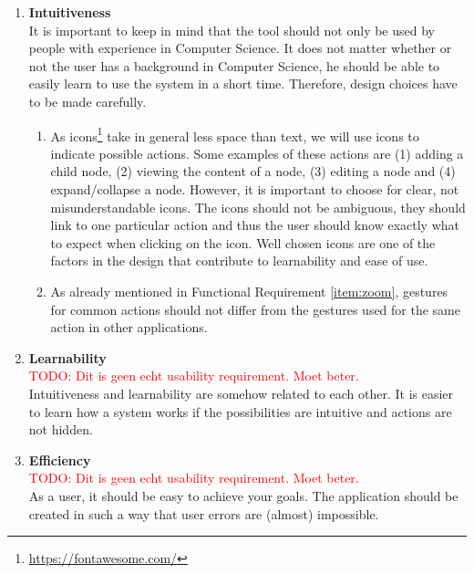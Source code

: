 \begin{enumerate}[label=\textbf{\arabic*}., ref=\arabic*]
	\item \textbf{Intuitiveness\label{item:intuitiveness}} \hfill \\
	It is important to keep in mind that the tool should not only be used by people with experience in Computer Science. It does not matter whether or not the user has a background in Computer Science, he should be able to easily learn to use the system in a short time. Therefore, design choices have to be made carefully. 
	
	\begin{enumerate}
	
		\item As icons\footnote{\url{https://fontawesome.com/}} take in general less space than text, we will use icons to indicate possible actions. Some examples of these actions are (1) adding a child node, (2) viewing the content of a node, (3) editing a node and (4) expand/collapse a node. However, it is important to choose for clear, not misunderstandable icons. The icons should not be ambiguous, they should link to one particular action and thus the user should know exactly what to expect when clicking on the icon. Well chosen icons are one of the factors in the design that contribute to learnability and ease of use.\\
	
		\item As already mentioned in Functional Requirement \ref{item:zoom}, gestures for common actions should not differ from the gestures used for the same action in other applications.
				
	\end{enumerate}
	
	\item \textbf{Learnability\label{item:learnability}} \hfill \\
	\textcolor{red}{TODO: Dit is geen echt usability requirement. Moet beter.}\\
	Intuitiveness and learnability are somehow related to each other. It is easier to learn how a system works if the possibilities are intuitive and actions are not hidden.
	
	\item \textbf{Efficiency\label{item:efficiency}} \hfill \\
	\textcolor{red}{TODO: Dit is geen echt usability requirement. Moet beter.}\\
	As a user, it should be easy to achieve your goals. The application should be created in such a way that user errors are (almost) impossible.
	

\end{enumerate}
